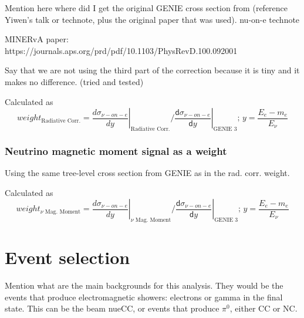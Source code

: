 Mention here where did I get the original GENIE cross section from (reference Yiwen's talk or technote, plus the original paper that was used). nu-on-e technote\cite{NOVA-doc-56383}


MINERvA paper:
https://journals.aps.org/prd/pdf/10.1103/PhysRevD.100.092001

Say that we are not using the third part of the correction because it is tiny and it makes no difference. (tried and tested)

Calculated as 
\begin{equation}
weight_{\text{Radiative Corr.}} = \left.\frac{d\sigma_{\nu-on-e}}{dy}\right|_{\text{Radiative Corr.}} / \left.\frac{\textsf{d}\sigma_{\nu-on-e}}{\textsf{d}y}\right|_{\text{GENIE 3}};\,y=\frac{E_e-m_e}{E_\nu}
\end{equation}

\subsubsection*{Neutrino magnetic moment signal as a weight}

Using the same tree-level cross section from GENIE as in the rad. corr. weight.


Calculated as 
\begin{equation}
weight_{\nu\text{ Mag. Moment}} = \left.\frac{d\sigma_{\nu-on-e}}{dy}\right|_{\nu\text{ Mag. Moment}} / \left.\frac{\textsf{d}\sigma_{\nu-on-e}}{\textsf{d}y}\right|_{\text{GENIE 3}};\,y=\frac{E_e-m_e}{E_\nu}
\end{equation}


\section{Event selection}

Mention what are the main backgrounds for this analysis. They would be the events that produce electromagnetic showers: electrons or gamma in the final state. This can be the beam nueCC, or events that produce $\pi^0$, either CC or NC. 

